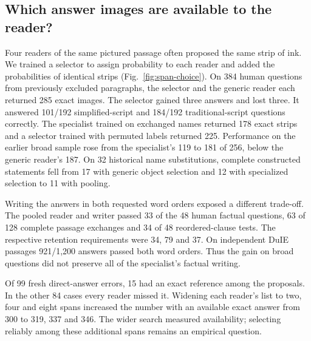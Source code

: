 \subsection*{Which answer images are available to the reader?}
Four readers of the same pictured passage often proposed the same strip of ink. We trained a selector to assign probability to each reader and added the probabilities of identical strips (Fig.~\ref{fig:span-choice}). On 384 human questions from previously excluded paragraphs, the selector and the generic reader each returned 285 exact images. The selector gained three answers and lost three. It answered 101/192 simplified-script and 184/192 traditional-script questions correctly. The specialist trained on exchanged names returned 178 exact strips and a selector trained with permuted labels returned 225. Performance on the earlier broad sample rose from the specialist's 119 to 181 of 256, below the generic reader's 187. On 32 historical name substitutions, complete constructed statements fell from 17 with generic object selection and 12 with specialized selection to 11 with pooling.

Writing the answers in both requested word orders exposed a different trade-off. The pooled reader and writer passed 33 of the 48 human factual questions, 63 of 128 complete passage exchanges and 34 of 48 reordered-clause tests. The respective retention requirements were 34, 79 and 37. On independent DuIE passages 921/1,200 answers passed both word orders. Thus the gain on broad questions did not preserve all of the specialist's factual writing.

Of 99 fresh direct-answer errors, 15 had an exact reference among the proposals. In the other 84 cases every reader missed it. Widening each reader's list to two, four and eight spans increased the number with an available exact answer from 300 to 319, 337 and 346. The wider search measured availability; selecting reliably among these additional spans remains an empirical question.

